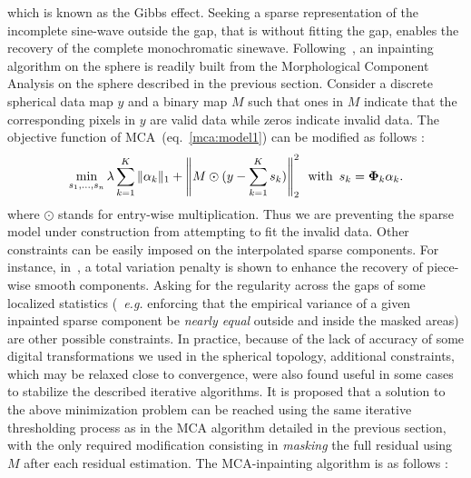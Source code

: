 which is known as the Gibbs effect. Seeking a sparse representation of the incomplete sine-wave outside the gap, that is without 
fitting the gap, enables the recovery of the complete monochromatic sinewave.
%
Following~\cite{starck:elad05}, an inpainting algorithm on the sphere is readily built from the Morphological Component Analysis 
on the sphere described in the previous section. Consider a discrete spherical data map $y$ and a binary map $M$ such that ones 
in $M$ indicate that the corresponding pixels in $y$ are valid data while zeros indicate invalid data. The objective function of 
MCA~(eq.~\ref{mca:model1}) can be modified as follows : 
 \begin{equation}\label{inp:model}
\min_{s_1,\ldots,s_n} \lambda \sum_{k=1}^K  \|\alpha_k\|_1 + \left\|M  \odot (y-\sum_{k=1}^K s_k) \right\|_2^2\,\,\,\textrm{with}\,\,\,s_k ={\bf \Phi}_k \alpha_k .
\end{equation}
where $\odot$ stands for entry-wise multiplication. Thus we are preventing the sparse model under construction from attempting to fit 
the invalid data. Other constraints can be easily imposed on the interpolated sparse components. For instance, in~\cite{starck:elad05}, 
a total variation penalty is shown to enhance the recovery of piece-wise smooth components. Asking for the regularity across the gaps of 
some localized statistics (~\emph{e.g.} enforcing that the empirical variance of a given inpainted sparse component be \emph{nearly equal} 
outside and inside the masked areas) are other possible constraints. In practice, because of the lack of accuracy of some digital 
transformations we used in the spherical topology, additional constraints, which may be relaxed close to convergence, were also found 
useful in some cases to stabilize the described iterative algorithms. 
%
It is proposed that a solution to the above minimization problem can be reached using the same iterative thresholding process as 
in the MCA algorithm detailed in the previous section, with the only required modification consisting in \emph{masking} the full 
residual using $M$ after each residual estimation. The MCA-inpainting algorithm is as follows : 
